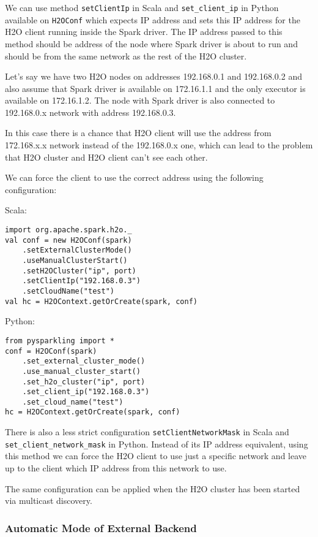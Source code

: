 We can use method \texttt{setClientIp} in Scala and \texttt{set\_client\_ip} in Python available on \texttt{H2OConf} which expects IP address and sets this IP address for the H2O client running inside the Spark driver. The IP address passed to this method should be address of the node where Spark driver is about to run and should be from the same network as the rest of the H2O cluster.

Let's say we have two H2O nodes on addresses 192.168.0.1 and 192.168.0.2 and also assume that Spark driver is available on 172.16.1.1 and the only executor is available on 172.16.1.2. The node with Spark driver is also connected to 192.168.0.x network with address 192.168.0.3.

In this case there is a chance that H2O client will use the address from 172.168.x.x network instead of the 192.168.0.x one, which can lead to the problem that H2O cluster and H2O client can't see each other.

We can force the client to use the correct address using the following configuration:

Scala:
\begin{lstlisting}[style=Scala]
import org.apache.spark.h2o._
val conf = new H2OConf(spark)
    .setExternalClusterMode()
    .useManualClusterStart()
    .setH2OCluster("ip", port)
    .setClientIp("192.168.0.3")
    .setCloudName("test")
val hc = H2OContext.getOrCreate(spark, conf)
\end{lstlisting}

Python:
\begin{lstlisting}[style=Python]
from pysparkling import *
conf = H2OConf(spark)
    .set_external_cluster_mode()
    .use_manual_cluster_start()
    .set_h2o_cluster("ip", port)
    .set_client_ip("192.168.0.3")
    .set_cloud_name("test")
hc = H2OContext.getOrCreate(spark, conf)
\end{lstlisting}

There is also a less strict configuration \texttt{setClientNetworkMask} in Scala and \texttt{set\_client\_network\_mask} in Python. Instead of its IP address equivalent, using this method we can force the H2O client to use just a specific network and leave up to the client which IP address from this network to use.

The same configuration can be applied when the H2O cluster has been started via multicast discovery.

\subsubsection{Automatic Mode of External Backend}

